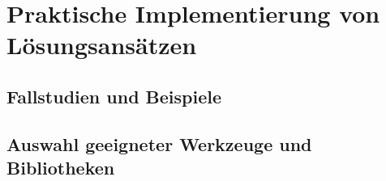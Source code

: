 \section{Praktische Implementierung von Lösungsansätzen}\label{sec:solution}

\subsection{Fallstudien und Beispiele}\label{sec:solution-examples}

\subsection{Auswahl geeigneter Werkzeuge und Bibliotheken}\label{sec:tools}

